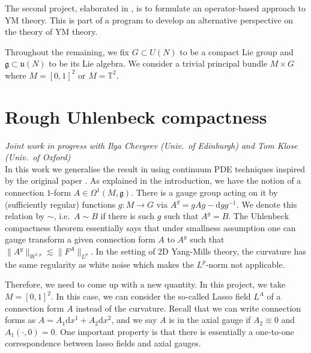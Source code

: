 \documentclass[12pt]{article}
\numberwithin{equation}{section}
\theoremstyle{definition}
\theoremstyle{remark}
\newcommand{\dif}{\,\mathrm{d}}
\newcommand{\diff}{\mathrm{d}}
\newcommand{\1}{\mathbf 1}
\newcommand{\<}{\langle}
\renewcommand{\>}{\rangle}
\newcommand{\fg}{\mathfrak g}
\newcommand{\fu}{\mathfrak u}
\newcommand{\bT}{\mathbb T}
\begin{document}
The second project, elaborated in , is to formulate an operator-based approach to YM theory.
This is part of a program to develop an alternative perspective on the theory of YM theory.

%
Throughout the remaining, we fix  $G\subset U(N)$ to be a compact Lie group and $\fg\subset \fu(N)$ to be its Lie algebra. We consider a trivial principal bundle $M\times G$ where $M=[0,1]^2$ or $M=\bT^2$. %




\section{Rough Uhlenbeck compactness}\label{sec:RUC}
\vspace{-7pt}\textit{{\footnotesize Joint work in progress with Ilya Chevyrev (Univ.\ of Edinburgh) and Tom Klose (Univ.\  of Oxford)}}\\

\noindent In this work we generalise the result in \cite{Chevyrev19} using continuum PDE techniques inspired by the original paper \cite{Uhlenbeck82}. As explained in the introduction, we have the notion of a connection $1$-form $A\in\Omega^1(M,\mathfrak g)$. There is a gauge group acting on it by (sufficiently regular) functions $g:M\to G$ via $A^g=gAg-\diff gg^{-1}$. We denote this relation by $\sim$, i.e.\ $A\sim B$ if there is such $g$ such that $A^g=B$.  The Uhlenbeck compactness theorem essentially says that under smallness assumption one can gauge transform a given connection form $A$ to $A^g$ such that 
$
\|A^g\|_{W^{1,p}}\lesssim \|F^A\|_{L^p}.
$
In the setting of 2D Yang-Mills theory, the curvature has the same regularity as white noise which makes the $L^p$-norm not applicable. %

Therefore, we need to come up with a new quantity. In this project, we take $M=[0,1]^2$. In this case, we can consider the so-called Lasso field $L^A$ of a connection form $A$ instead of the curvature. Recall that we can write connection forms as $A=A_1\diff x^1+A_2\diff x^2$, and we say $A$ is in the axial gauge if $A_2\equiv 0$ and $A_1(\cdot,0)=0$. One important property is that there is essentially a one-to-one correspondence between lasso fields and axial gauges. 
\end{document}
